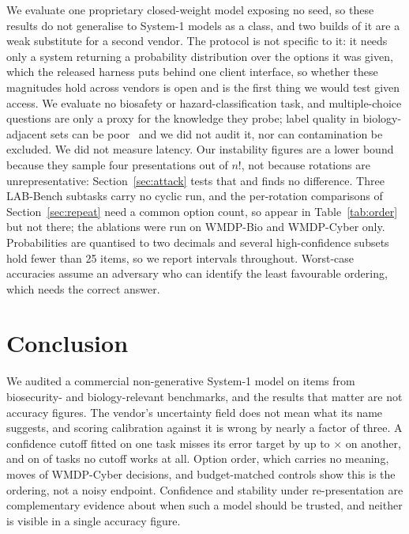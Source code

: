 \documentclass[conference,compsoc]{IEEEtran}
\begin{document}
We evaluate one proprietary closed-weight model exposing no seed, so these results do not
generalise to System-1 models as a class, and two builds of it are a weak substitute for a
second vendor. The protocol is not specific to it: it needs only a system returning a
probability distribution over the options it was given, which the released harness puts
behind one client interface, so whether these magnitudes hold across vendors is open and is
the first thing we would test given access. We evaluate no biosafety or
hazard-classification task, and multiple-choice questions are only a proxy for the
knowledge they probe; label quality in biology-adjacent sets can be poor~\cite{mmluredux}
and we did not audit it, nor can contamination be excluded. We did not measure latency.
Our instability figures are a lower bound because they sample four presentations out of
$n!$, not because rotations are unrepresentative: Section~\ref{sec:attack} tests that and
finds no difference. Three LAB-Bench subtasks carry no cyclic run, and the per-rotation
comparisons of Section~\ref{sec:repeat} need a common option count, so
\statCircMixedList{} appear in Table~\ref{tab:order} but not there; the ablations were run
on WMDP-Bio and WMDP-Cyber only. Probabilities are quantised to two decimals and several
high-confidence subsets hold fewer than 25 items, so we report intervals throughout.
Worst-case accuracies assume an adversary who can identify the least favourable ordering,
which needs the correct answer.

\section{Conclusion}

We audited a commercial non-generative System-1 model on \statNItems{} items from
biosecurity- and biology-relevant benchmarks, and the results that matter are not accuracy
figures. The vendor's uncertainty field does not mean what its name suggests, and scoring
calibration against it is wrong by nearly a factor of three. A confidence cutoff fitted on
one task misses its error target by up to \statThrBioWorstRatio{}$\times$ on another, and
on \statThrNUnachievable{} of \statThrNDatasets{} tasks no cutoff works at all. Option
order, which carries no meaning, moves \statAtkSteerRotCyber{} of WMDP-Cyber decisions,
and budget-matched controls show this is the ordering, not a noisy endpoint. Confidence
and stability under re-presentation are complementary evidence about when such a model
should be trusted, and neither is visible in a single accuracy figure.
\end{document}

